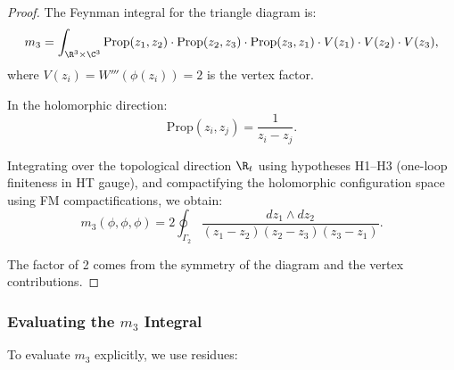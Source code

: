 \begin{proof}
The Feynman integral for the triangle diagram is:
\begin{equation}
m_3 = \int_{\R^3 \times \C^3} \text{Prop}(z_1, z_2) \cdot \text{Prop}(z_2, z_3) \cdot \text{Prop}(z_3, z_1) \cdot V(z_1) \cdot V(z_2) \cdot V(z_3),
\end{equation}
where $V(z_i) = W'''(\phi(z_i)) = 2$ is the vertex factor.

In the holomorphic direction:
\begin{equation}
\text{Prop}(z_i, z_j) = \frac{1}{z_i - z_j}.
\end{equation}

Integrating over the topological direction $\R_t$ using hypotheses H1--H3 (one-loop finiteness in HT gauge), and compactifying the holomorphic configuration space using FM compactifications, we obtain:
\begin{equation}
m_3(\phi, \phi, \phi) = 2 \oint_{\Gamma_2} \frac{dz_1 \wedge dz_2}{(z_1 - z_2)(z_2 - z_3)(z_3 - z_1)}.
\end{equation}

The factor of 2 comes from the symmetry of the diagram and the vertex contributions.
\end{proof}

\subsubsection{Evaluating the $m_3$ Integral}

To evaluate $m_3$ explicitly, we use residues:

